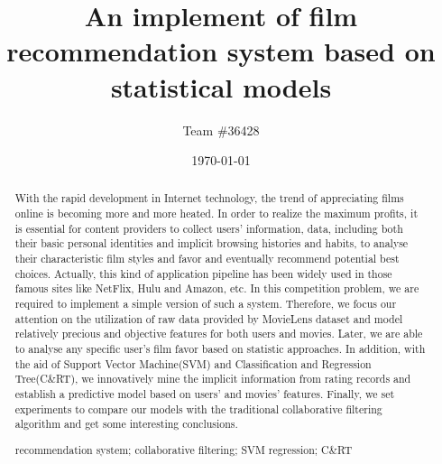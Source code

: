 \documentclass[a4paper,11pt]{article}
\title{An implement of film recommendation system based on statistical models}
\author{Team \#36428}
\date{\today}
\begin{document}
   
\def\abstractname{Abstract}%
\begin{abstract}
  With the rapid development in Internet technology, the trend of appreciating films online is becoming more and more heated. In order to realize the maximum profits, it is essential for content providers to collect users' information, data, including both their basic personal identities and implicit browsing histories and habits, to analyse their characteristic film styles and favor and eventually recommend potential best choices. Actually, this kind of application pipeline has been widely used in those famous sites like NetFlix, Hulu and Amazon, etc. 
  In this competition problem, we are required to implement a simple version of such a system. Therefore, we focus our attention on the utilization of raw data provided by MovieLens dataset and model relatively precious and objective features for both users and movies. Later, we are able to analyse any specific user's film favor based on statistic approaches. In addition, with the aid of Support Vector Machine(SVM) and Classification and Regression Tree(C\&RT), we innovatively mine the implicit information from rating records and establish a predictive model based on users' and movies' features. Finally, we set experiments to compare our models with the traditional collaborative filtering algorithm and get some interesting conclusions. 
  
\begin{keywords}
recommendation system; collaborative filtering; SVM regression; C\&RT
\end{keywords}
\end{abstract}

\maketitle
\pagestyle{empty}
%
\newpage                                                          %


\tableofcontents                                                  %
\newpage
\pagestyle{fancy}                                                     %

\end{document}
